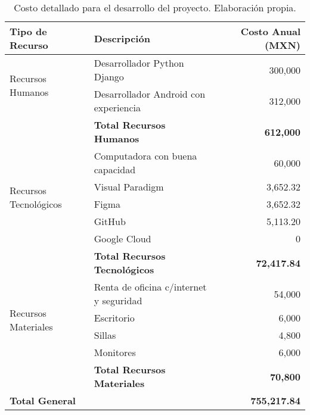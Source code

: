 \begin{table}[h!]
	\centering
	\begin{tabular}{|l|l|r|}
		\hline
		\textbf{Tipo de Recurso}      & \textbf{Descripción}                          & \textbf{Costo Anual (MXN)} \\ \hline
		\multirow{2}{*}{Recursos Humanos} & Desarrollador Python Django                   & 300,000                   \\ 
		& Desarrollador Android con experiencia         & 312,000                   \\ \hline
		& \textbf{Total Recursos Humanos}              & \textbf{612,000}          \\ \hline
		\multirow{5}{*}{Recursos Tecnológicos} & Computadora con buena capacidad               & 60,000                    \\ 
		& Visual Paradigm                               & 3,652.32                  \\ 
		& Figma                                        & 3,652.32                  \\ 
		& GitHub                                       & 5,113.20                  \\ 
		& Google Cloud                                 & 0                         \\ \hline
		& \textbf{Total Recursos Tecnológicos}         & \textbf{72,417.84}        \\ \hline
		\multirow{4}{*}{Recursos Materiales} & Renta de oficina c/internet y seguridad       & 54,000                    \\ 
		& Escritorio                                   & 6,000                     \\ 
		& Sillas                                       & 4,800                     \\ 
		& Monitores                                    & 6,000                     \\ \hline
		& \textbf{Total Recursos Materiales}           & \textbf{70,800}           \\ \hline
		\textbf{Total General}        &                                              & \textbf{755,217.84}       \\ \hline
	\end{tabular}
	\caption{Costo detallado para el desarrollo del proyecto. Elaboración propia.}
	\label{tabla:costo-proyecto}
\end{table}


